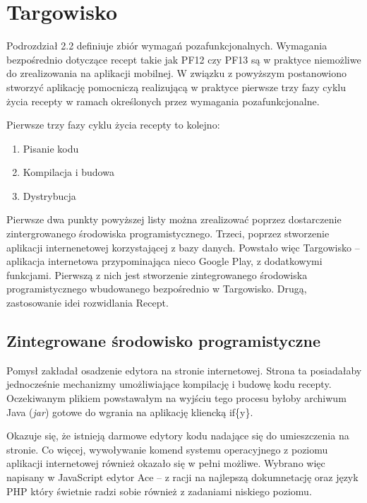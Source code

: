 \documentclass[11pt,a4paper,polish,thesis]{dcsbook}
\begin{document}
\section{Targowisko}
Podrozdział 2.2 definiuje zbiór wymagań pozafunkcjonalnych. Wymagania bezpośrednio dotyczące recept takie jak PF12 czy PF13 są w praktyce niemożliwe do zrealizowania
na aplikacji mobilnej. W związku z powyższym postanowiono stworzyć aplikację pomocniczą realizującą w praktyce pierwsze trzy fazy cyklu życia recepty w
ramach określonych przez wymagania pozafunkcjonalne.

Pierwsze trzy fazy cyklu życia recepty to kolejno:
\begin{enumerate}
\item Pisanie kodu
\item Kompilacja i budowa
\item Dystrybucja
\end{enumerate}

Pierwsze dwa punkty powyższej listy można zrealizować poprzez dostarczenie zintergrowanego środowiska programistycznego. Trzeci, poprzez stworzenie aplikacji
internenetowej korzystającej z bazy danych. Powstało więc Targowisko -- aplikacja internetowa przypominająca nieco Google Play, z dodatkowymi funkcjami.
Pierwszą z nich jest stworzenie zintegrowanego środowiska programistycznego wbudowanego bezpośrednio w Targowisko. Drugą, zastosowanie idei rozwidlania Recept.

\subsection{Zintegrowane środowisko programistyczne}

Pomysł zakładał osadzenie edytora na stronie internetowej. Strona ta posiadałaby jednocześnie mechanizmy umożliwiające kompilację i budowę kodu recepty. Oczekiwanym
plikiem powstawałym na wyjściu tego procesu byłoby archiwum Java (\emph{jar}) gotowe do wgrania na aplikację kliencką if\{y\}.

Okazuje się, że istnieją darmowe edytory kodu nadające się do umieszczenia na stronie. Co więcej, wywoływanie komend systemu operacyjnego z poziomu aplikacji
internetowej również okazało się w pełni możliwe. Wybrano więc napisany w JavaScript edytor Ace -- z racji na najlepszą dokumnetację oraz język PHP który
świetnie radzi sobie również z zadaniami niskiego poziomu.
\end{document}
